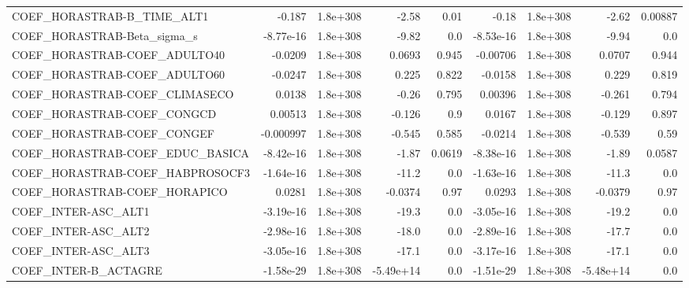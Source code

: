 \begin{tabular}{lrrrrrrrr}
COEF\_HORASTRAB-B\_TIME\_ALT1        &      -0.187 &     1.8e+308 &     -2.58 &     0.01 &      -0.18 &    1.8e+308 &        -2.62 &       0.00887 \\
COEF\_HORASTRAB-Beta\_sigma\_s       &   -8.77e-16 &     1.8e+308 &     -9.82 &      0.0 &  -8.53e-16 &    1.8e+308 &        -9.94 &           0.0 \\
COEF\_HORASTRAB-COEF\_ADULTO40      &     -0.0209 &     1.8e+308 &    0.0693 &    0.945 &   -0.00706 &    1.8e+308 &       0.0707 &         0.944 \\
COEF\_HORASTRAB-COEF\_ADULTO60      &     -0.0247 &     1.8e+308 &     0.225 &    0.822 &    -0.0158 &    1.8e+308 &        0.229 &         0.819 \\
COEF\_HORASTRAB-COEF\_CLIMASECO     &      0.0138 &     1.8e+308 &     -0.26 &    0.795 &    0.00396 &    1.8e+308 &       -0.261 &         0.794 \\
COEF\_HORASTRAB-COEF\_CONGCD        &     0.00513 &     1.8e+308 &    -0.126 &      0.9 &     0.0167 &    1.8e+308 &       -0.129 &         0.897 \\
COEF\_HORASTRAB-COEF\_CONGEF        &   -0.000997 &     1.8e+308 &    -0.545 &    0.585 &    -0.0214 &    1.8e+308 &       -0.539 &          0.59 \\
COEF\_HORASTRAB-COEF\_EDUC\_BASICA   &   -8.42e-16 &     1.8e+308 &     -1.87 &   0.0619 &  -8.38e-16 &    1.8e+308 &        -1.89 &        0.0587 \\
COEF\_HORASTRAB-COEF\_HABPROSOCF3   &   -1.64e-16 &     1.8e+308 &     -11.2 &      0.0 &  -1.63e-16 &    1.8e+308 &        -11.3 &           0.0 \\
COEF\_HORASTRAB-COEF\_HORAPICO      &      0.0281 &     1.8e+308 &   -0.0374 &     0.97 &     0.0293 &    1.8e+308 &      -0.0379 &          0.97 \\
COEF\_INTER-ASC\_ALT1               &   -3.19e-16 &     1.8e+308 &     -19.3 &      0.0 &  -3.05e-16 &    1.8e+308 &        -19.2 &           0.0 \\
COEF\_INTER-ASC\_ALT2               &   -2.98e-16 &     1.8e+308 &     -18.0 &      0.0 &  -2.89e-16 &    1.8e+308 &        -17.7 &           0.0 \\
COEF\_INTER-ASC\_ALT3               &   -3.05e-16 &     1.8e+308 &     -17.1 &      0.0 &  -3.17e-16 &    1.8e+308 &        -17.1 &           0.0 \\
COEF\_INTER-B\_ACTAGRE              &   -1.58e-29 &     1.8e+308 & -5.49e+14 &      0.0 &  -1.51e-29 &    1.8e+308 &    -5.48e+14 &           0.0 \\

\end{tabular}
